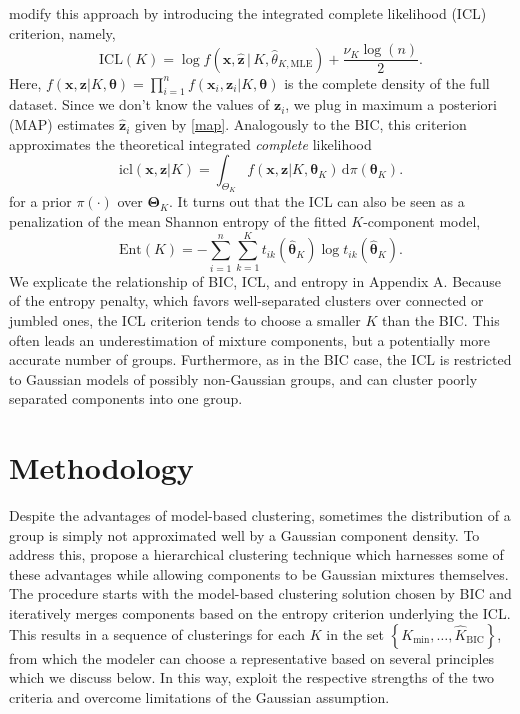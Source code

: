\documentclass{uwstat572}
\newcommand*\set[1]{\left\{#1\right\}}
\newcommand*\estim[1]{\widehat{#1}}
\newcommand*\der{\text{d}}
\newcommand*\bx{\mathbf{x}}
\newcommand*\bz{\mathbf{z}}
\newcommand*\btheta{\boldsymbol{\theta}}
\newcommand*\bTheta{\boldsymbol{\Theta}}
\renewcommand\;{\,}
\begin{document}
\citet{Biernacki00} modify this approach by introducing the integrated complete likelihood (ICL) criterion, namely,
\begin{equation}
\text{ICL}(K)
	= 
	\log f \left(\bx, \estim\bz \;\big|\; K, \estim\theta_{K, \text{MLE}}\right)
		 + \frac{ \nu_K \log(n) }{2}.
\end{equation}
Here, $f(\bx, \bz | K, \btheta) = \prod_{i=1}^n f(\bx_i, \bz_i | K, \btheta)$ is the complete density of the full dataset.
Since we don't know the values of $\bz_i$, we plug in maximum a posteriori (MAP) estimates $\estim\bz_i$ given by \eqref{map}.
Analogously to the BIC, this criterion approximates the theoretical integrated \emph{complete} likelihood
\begin{equation}
\text{icl}(\bx, \bz | K)
	 = \int_{\Theta_K} f(\bx, \bz | K, \btheta_K) \; \der \pi(\btheta_K).
\end{equation}
for a prior $\pi(\cdot)$ over $\bTheta_K$.
It turns out that the ICL can also be seen as a penalization of the mean Shannon entropy of the fitted $K$-component model, 
\begin{equation}
\text{Ent}(K)
	 = - \sum_{i=1}^n \sum_{k = 1}^K t_{ik}\left(\estim\btheta_K \right) 
	 	\log t_{ik}\left(\estim\btheta_K \right).
\end{equation}
We explicate the relationship of BIC, ICL, and entropy in Appendix A.
Because of the entropy penalty, which favors well-separated clusters over connected or jumbled ones, the ICL criterion tends to choose a smaller $K$ than the BIC.
This often leads an underestimation of mixture components, but a potentially more accurate number of groups.
Furthermore, as in the BIC case, the $\text{ICL}$ is restricted to Gaussian models of possibly non-Gaussian groups, and can cluster poorly separated components into one group.


\section{Methodology}
Despite the advantages of model-based clustering, sometimes the distribution of a group is simply not approximated well by a Gaussian component density.
To address this, \cite{Baudry10} propose a hierarchical clustering technique which harnesses some of these advantages while allowing components to be Gaussian mixtures themselves. 
The procedure starts with the model-based clustering solution chosen by BIC and iteratively merges components based on the entropy criterion underlying the ICL.
This results in a sequence of clusterings for each $K$ in the set $\set{K_\text{min}, \dotsc, \estim K_\text{BIC}}$, from which the modeler can choose a representative based on several principles which we discuss below.
In this way, \cite{Baudry10} exploit the respective strengths of the two criteria and overcome limitations of the Gaussian assumption.
\end{document}
